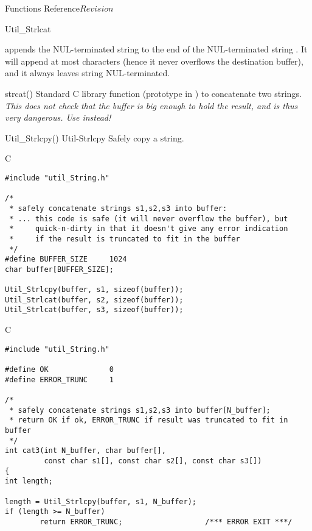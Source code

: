 \begin{cactuspart}{ Functions Reference}{}{$Revision$}
\begin{FunctionDescription}{Util\_Strlcat}
\begin{Discussion}
 appends the NUL-terminated string  to the
end of the NUL-terminated string .  It will append at most
 characters (hence it never overflows the
destination buffer), and it always leaves  string NUL-terminated.
\end{Discussion}

\begin{SeeAlsoSection}
\begin{SeeAlso}{strcat()}
Standard C library function (prototype in )
to concatenate two strings.
{\em This does not check that the buffer is big enough to hold the result,
and is thus very dangerous.  Use  instead!}
\end{SeeAlso}
\begin{SeeAlso2} {Util\_Strlcpy()} {Util-Strlcpy}
Safely copy a string.
\end{SeeAlso2}
\end{SeeAlsoSection}

\begin{ExampleSection}
\begin{Example}{C}
\begin{verbatim}
#include "util_String.h"

/*
 * safely concatenate strings s1,s2,s3 into buffer:
 * ... this code is safe (it will never overflow the buffer), but
 *     quick-n-dirty in that it doesn't give any error indication
 *     if the result is truncated to fit in the buffer
 */
#define BUFFER_SIZE     1024
char buffer[BUFFER_SIZE];

Util_Strlcpy(buffer, s1, sizeof(buffer));
Util_Strlcat(buffer, s2, sizeof(buffer));
Util_Strlcat(buffer, s3, sizeof(buffer));
\end{verbatim}
\end{Example}
\begin{Example}{C}
\begin{verbatim}
#include "util_String.h"

#define OK              0
#define ERROR_TRUNC     1

/*
 * safely concatenate strings s1,s2,s3 into buffer[N_buffer];
 * return OK if ok, ERROR_TRUNC if result was truncated to fit in buffer
 */
int cat3(int N_buffer, char buffer[],
         const char s1[], const char s2[], const char s3[])
{
int length;

length = Util_Strlcpy(buffer, s1, N_buffer);
if (length >= N_buffer)
        return ERROR_TRUNC;                   /*** ERROR EXIT ***/


\end{verbatim}
\end{Example}
\end{ExampleSection}
\end{FunctionDescription}
\end{cactuspart}
